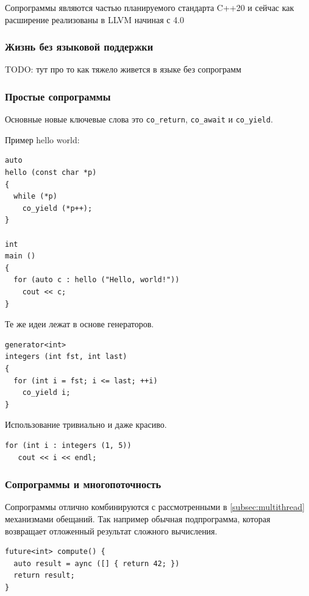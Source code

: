 \documentclass[a4paper,12pt,oneside]{article}
\begin{document}
Сопрограммы являются частью планируемого стандарта C++20 и сейчас как расширение реализованы в LLVM начиная с 4.0

\subsubsection{Жизнь без языковой поддержки}

TODO: тут про то как тяжело живется в языке без сопрограмм

\subsubsection{Простые сопрограммы}

Основные новые ключевые слова это \lstinline!co_return!, \lstinline!co_await! и \lstinline!co_yield!.

Пример hello world:

\begin{lstlisting}
auto 
hello (const char *p) 
{
  while (*p)
    co_yield (*p++);
}

int 
main () 
{
  for (auto c : hello ("Hello, world!"))
    cout << c;
}
\end{lstlisting}

Те же идеи лежат в основе генераторов.

\begin{lstlisting}
generator<int> 
integers (int fst, int last) 
{
  for (int i = fst; i <= last; ++i)
    co_yield i;
}
\end{lstlisting}

Использование тривиально и даже красиво.

\begin{lstlisting}
for (int i : integers (1, 5))
   cout << i << endl;
\end{lstlisting}

\subsubsection{Сопрограммы и многопоточность}

Сопрограммы отлично комбинируются с рассмотренными в \ref{subsec:multithread} механизмами обещаний. Так например обычная подпрограмма, которая возвращает отложенный результат сложного вычисления.

\begin{lstlisting}
future<int> compute() {
  auto result = aync ([] { return 42; })
  return result;
}
\end{lstlisting}
\end{document}

